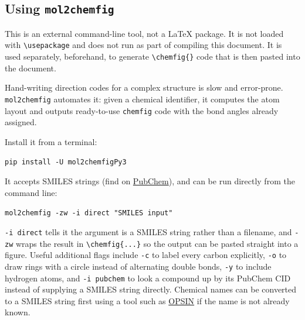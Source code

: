 	\begin{requation}
		\label{rxn:chemfig-combustion}
	\end{requation}
	
	\subsection{Using \texttt{mol2chemfig}}
	\noindent\colorbox{themecolour!15}{\parbox{\linewidth}{\small This is an external command-line tool, not a \LaTeX{} package. It is not loaded with \texttt{\textbackslash usepackage} and does not run as part of compiling this document. It is used separately, beforehand, to generate \texttt{\textbackslash chemfig\{\}} code that is then pasted into the document.}}\vspace{0.5\baselineskip}
	
	Hand-writing direction codes for a complex structure is slow and error-prone. \texttt{mol2chemfig} automates it: given a chemical identifier, it computes the atom layout and outputs ready-to-use \texttt{chemfig} code with the bond angles already assigned.
	
	Install it from a terminal:
	
	\vspace{16pt}\noindent\texttt{pip install -U mol2chemfigPy3}\vspace{16pt}
	
	It accepts SMILES strings (find on \href{https://pubchem.ncbi.nlm.nih.gov/}{PubChem}), and can be run directly from the command line:
	
	\vspace{16pt}\noindent\texttt{mol2chemfig -zw -i direct "\textcolor{themecolour}{SMILES input}"}\vspace{16pt}
	
	\texttt{-i direct} tells it the argument is a SMILES string rather than a filename, and \texttt{-zw} wraps the result in \texttt{\textbackslash chemfig\{...\}} so the output can be pasted straight into a figure. Useful additional flags include \texttt{-c} to label every carbon explicitly, \texttt{-o} to draw rings with a circle instead of alternating double bonds, \texttt{-y} to include hydrogen atoms, and \texttt{-i pubchem} to look a compound up by its PubChem CID instead of supplying a SMILES string directly. Chemical names can be converted to a SMILES string first using a tool such as \href{https://www.ebi.ac.uk/opsin/}{OPSIN} if the name is not already known.
	
